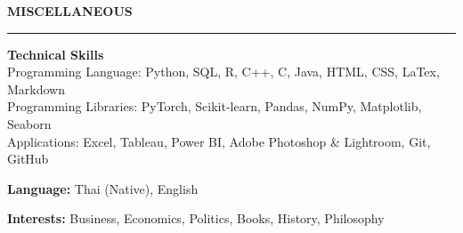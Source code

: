 \documentclass[11pt]{article}
\begin{document}


\vspace{9pt}
\textbf{MISCELLANEOUS}
\vspace{5pt}
{\color{NavyBlue}\hrule}
\vspace{6pt}

\textbf{Technical Skills}\\
\hspace*{7pt} Programming Language: Python, SQL, R, C++, C, Java, HTML, CSS, LaTex, Markdown\\
\hspace*{7pt} Programming Libraries: PyTorch, Scikit-learn, Pandas, NumPy, Matplotlib, Seaborn\\
\hspace*{7pt} Applications: Excel, Tableau, Power BI, Adobe Photoshop \& Lightroom, Git, GitHub

\textbf{Language:} Thai (Native), English

\textbf{Interests:} Business, Economics, Politics, Books, History, Philosophy
\end{document}
